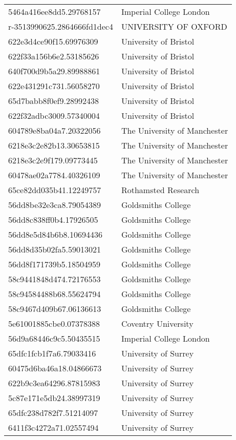 \begin{tabular}{ll}
5464a416ee8dd5.29768157 & Imperial College London \\
r-3513990625.2864666fd1dec4 & UNIVERSITY OF OXFORD \\
622e3d4ce90f15.69976309 & University of Bristol \\
622f33a156b6e2.53185626 & University of Bristol \\
640f700d9b5a29.89988861 & University of Bristol \\
622e431291c731.56058270 & University of Bristol \\
65d7babb8f0ef9.28992438 & University of Bristol \\
622f32adbc3009.57340004 & University of Bristol \\
604789e8ba04a7.20322056 & The University of Manchester \\
6218e3c2e82b13.30653815 & The University of Manchester \\
6218e3c2e9f179.09773445 & The University of Manchester \\
60478ae02a7784.40326109 & The University of Manchester \\
65ce82dd035b41.12249757 & Rothamsted Research \\
56dd8be32e3ca8.79054389 & Goldsmiths College \\
56dd8c838ff0b4.17926505 & Goldsmiths College \\
56dd8e5d84b6b8.10694436 & Goldsmiths College \\
56dd8d35b02fa5.59013021 & Goldsmiths College \\
56dd8f171739b5.18504959 & Goldsmiths College \\
58c9441848d474.72176553 & Goldsmiths College \\
58c94584488b68.55624794 & Goldsmiths College \\
58c9467d409b67.06136613 & Goldsmiths College \\
5e61001885cbe0.07378388 & Coventry University \\
56d9a68446c9c5.50435515 & Imperial College London \\
65dfc1fcb1f7a6.79033416 & University of Surrey \\
60475d6ba46a18.04866673 & University of Surrey \\
622b9c3ea64296.87815983 & University of Surrey \\
5c87e171e5db24.38997319 & University of Surrey \\
65dfc238d782f7.51214097 & University of Surrey \\
6411f3c4272a71.02557494 & University of Surrey \\

\end{tabular}
